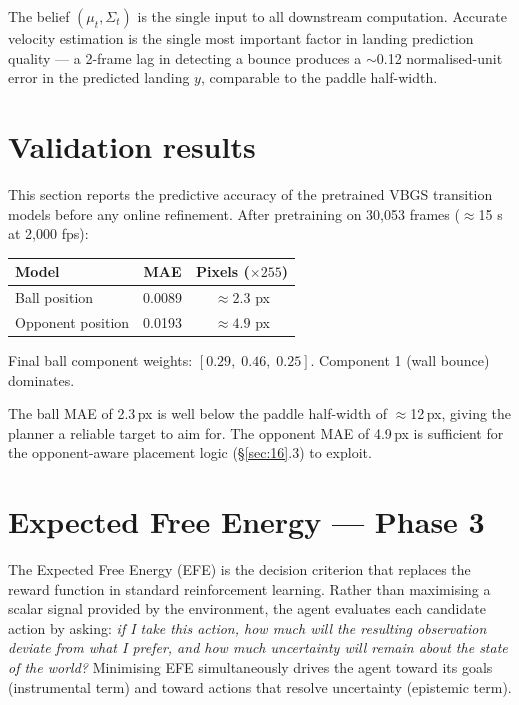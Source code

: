 \documentclass[12pt, a4paper]{article}
\newcommand{\1}{\mathbf{1}}
\begin{document}
The belief $(\mu_t, \Sigma_t)$ is the single input to all downstream computation.
Accurate velocity estimation is the single most important factor in landing
prediction quality --- a 2-frame lag in detecting a bounce produces a
$\sim$0.12 normalised-unit error in the predicted landing $y$, comparable to the
paddle half-width.

\section{Validation results}
\label{sec:10}

This section reports the predictive accuracy of the pretrained VBGS transition
models before any online refinement.  After pretraining on 30,053 frames
($\approx$15 s at 2,000 fps):

\begin{table}[ht]
\centering
\begin{tabular}{lcc}
\toprule
Model & MAE & Pixels ($\times 255$) \\
\midrule
Ball position     & 0.0089 & $\approx 2.3$ px \\
Opponent position & 0.0193 & $\approx 4.9$ px \\
\bottomrule
\end{tabular}
\end{table}

Final ball component weights: $[0.29,\; 0.46,\; 0.25]$.
Component 1 (wall bounce) dominates.

The ball MAE of 2.3\,px is well below the paddle half-width of $\approx$12\,px,
giving the planner a reliable target to aim for.  The opponent MAE of 4.9\,px is
sufficient for the opponent-aware placement logic (\S\ref{sec:16}.3) to exploit.

\section{Expected Free Energy --- Phase 3}
\label{sec:11}

The Expected Free Energy (EFE) is the decision criterion that replaces the reward
function in standard reinforcement learning.  Rather than maximising a scalar
signal provided by the environment, the agent evaluates each candidate action by
asking: \textit{if I take this action, how much will the resulting observation
deviate from what I prefer, and how much uncertainty will remain about the state
of the world?}  Minimising EFE simultaneously drives the agent toward its goals
(instrumental term) and toward actions that resolve uncertainty (epistemic term).
\end{document}
